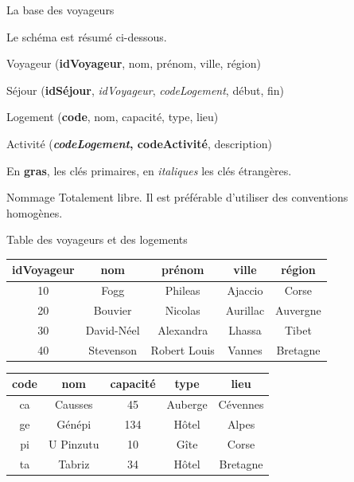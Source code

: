 

\begin{frame}{La base des voyageurs}

Le schéma est résumé ci-dessous. 
\vfill

\begin{redbullet}
  \item Voyageur (\textbf{idVoyageur}, nom, prénom, ville, région)
    \item  Séjour (\textbf{idSéjour}, \textit{idVoyageur}, \textit{codeLogement}, début, fin)
    \item Logement (\textbf{code}, nom, capacité, type, lieu)
    \item Activité (\textbf{\textit{codeLogement}, codeActivité}, description)
\end{redbullet}

\vfill

En \textbf{gras}, les clés primaires, en
\textit{italiques} les clés étrangères.

\begin{remblock}{Nommage}
Totalement libre. Il est préférable d'utiliser des conventions homogènes.
\end{remblock}

\end{frame}

\begin{frame}[fragile]{Table des voyageurs et des logements}

\begin{tabular}{c|c|c|c|c}
\textbf{idVoyageur} & \textbf{nom} & \textbf{prénom} & \textbf{ville} & \textbf{région}\\ \hline 
10 & Fogg & Phileas & Ajaccio & Corse\\ \hline 
20 & Bouvier & Nicolas & Aurillac & Auvergne\\ \hline 
30 & David-Néel & Alexandra & Lhassa & Tibet\\ \hline 
40 & Stevenson & Robert Louis & Vannes & Bretagne\\ \hline 
\end{tabular}

\vfill

\begin{tabular}{c|c|c|c|c}
\textbf{code} & \textbf{nom} & \textbf{capacité} & \textbf{type} & \textbf{lieu}\\ \hline 
ca & Causses & 45 & Auberge & Cévennes\\ \hline 
ge & Génépi & 134 & Hôtel & Alpes\\ \hline 
pi & U Pinzutu & 10 & Gîte & Corse\\ \hline 
ta & Tabriz & 34 & Hôtel & Bretagne\\ \hline 
\end{tabular}
\end{frame}


